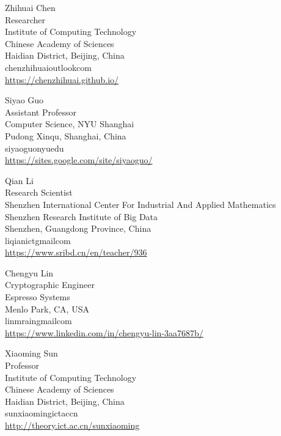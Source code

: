 \documentclass{toc}
\begin{document}
%
%
%
%
%
\begin{tocauthors}
\begin{tocinfo}[chen]
 Zhihuai Chen\\
 Researcher\\ %
 Institute of Computing Technology\\
 Chinese Academy of Sciences\\
 Haidian District, Beijing, China\\
 chenzhihuai\tocat{}outlook\tocdot{}com\\  %
 \url{https://chenzhihuai.github.io/} %
\end{tocinfo}

\begin{tocinfo}[guo]
 Siyao Guo\\
 Assistant Professor\\
 Computer Science, NYU Shanghai\\
 Pudong Xinqu, Shanghai, China\\
 siyao\tocdot{}guo\tocat{}nyu\tocdot{}edu \\   %
 \url{https://sites.google.com/site/siyaoguo/}      %
\end{tocinfo}

\begin{tocinfo}[li]
 Qian Li\\
 Research Scientist\\ %
 Shenzhen International Center For Industrial  And Applied Mathematics\\ %
 Shenzhen Research Institute of Big Data\\ %
 Shenzhen, Guangdong Province, China\\ %
 liqian\tocdot{}ict\tocat{}gmail\tocdot{}com\\ %
 \url{https://www.sribd.cn/en/teacher/936} %
\end{tocinfo}

\begin{tocinfo}[lin]
 Chengyu Lin\\
 Cryptographic Engineer\\ %
 Espresso Systems\\ %
 Menlo Park, CA, USA\\ %
 linmrain\tocat{}gmail\tocdot{}com\\ %
 \url{https://www.linkedin.com/in/chengyu-lin-3aa7687b/} %
\end{tocinfo}

\begin{tocinfo}[sun]
 Xiaoming Sun\\
 Professor\\
 Institute of Computing Technology\\
 Chinese Academy of Sciences\\
 Haidian District, Beijing, China\\
 sunxiaoming\tocat{}ict\tocdot{}ac\tocdot{}cn \\   
 \url{http://theory.ict.ac.cn/sunxiaoming}     
\end{tocinfo}
\end{tocauthors}
\end{document}
